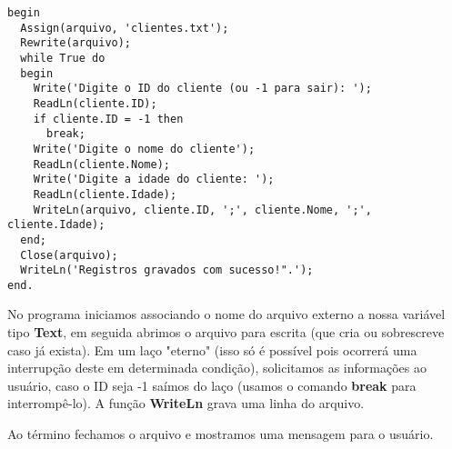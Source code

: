 \begin{lstlisting}[]
begin
  Assign(arquivo, 'clientes.txt');
  Rewrite(arquivo);
  while True do
  begin
    Write('Digite o ID do cliente (ou -1 para sair): ');
    ReadLn(cliente.ID);
    if cliente.ID = -1 then
      break;
    Write('Digite o nome do cliente');
    ReadLn(cliente.Nome);
    Write('Digite a idade do cliente: ');
    ReadLn(cliente.Idade);
    WriteLn(arquivo, cliente.ID, ';', cliente.Nome, ';', cliente.Idade);
  end;
  Close(arquivo);
  WriteLn('Registros gravados com sucesso!".');
end.	
\end{lstlisting}

No programa iniciamos associando o nome do arquivo externo a nossa variável tipo \textbf{Text}, em seguida abrimos o arquivo para escrita (que cria ou sobrescreve caso já exista). Em um laço "eterno" (isso só é possível pois ocorrerá uma interrupção deste em determinada condição), solicitamos as informações ao usuário, caso o ID seja -1 saímos do laço (usamos o comando \textbf{break} para interrompê-lo). A função \textbf{WriteLn} grava uma linha do arquivo.

Ao término fechamos o arquivo e mostramos uma mensagem para o usuário.

\clearpage